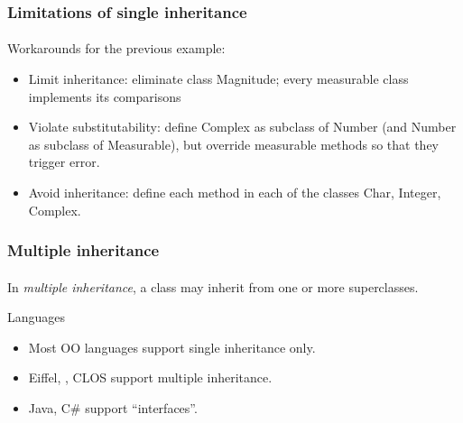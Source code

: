 \documentclass{beamer}
\begin{document}
\begin{frame}[fragile]
\frametitle{Limitations of single inheritance}
\framesubtitle{}
Workarounds for the previous example:

\begin{itemize}
\item Limit inheritance: eliminate class Magnitude; every measurable
class implements its comparisons
\item Violate substitutability: define Complex as subclass of Number
(and Number as subclass of Measurable), but override measurable
methods so that they trigger error.
\item Avoid inheritance: define each method in each of the classes
Char, Integer, Complex.
\end{itemize}
\end{frame}

\begin{frame}[fragile]
\frametitle{Multiple inheritance}
\framesubtitle{}
In \textit{multiple inheritance}, a class may inherit from one or
more superclasses.
\bigskip

Languages
\begin{itemize}
\item Most OO languages support single inheritance only.
\item Eiffel, \cpp, CLOS support multiple inheritance.
\item Java, C\# support ``interfaces''. 

\end{itemize}
\end{frame}
\end{document}
